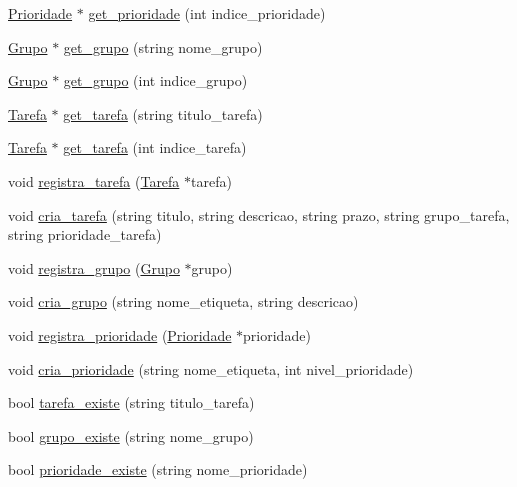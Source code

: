 \begin{DoxyCompactItemize}
\item 
\hyperlink{classPrioridade}{Prioridade} $\ast$ \hyperlink{classStorage_abc3618c3a0b69ffe6e895cd701b0516e}{get\+\_\+prioridade} (int indice\+\_\+prioridade)
\item 
\hyperlink{classGrupo}{Grupo} $\ast$ \hyperlink{classStorage_a1b478e593dd0b18eeb7fc0490b87b362}{get\+\_\+grupo} (string nome\+\_\+grupo)
\item 
\hyperlink{classGrupo}{Grupo} $\ast$ \hyperlink{classStorage_af340fa785af6416b6d7ca0eb38ea4be7}{get\+\_\+grupo} (int indice\+\_\+grupo)
\item 
\hyperlink{classTarefa}{Tarefa} $\ast$ \hyperlink{classStorage_af8f0367791223137d6249220bceb4d22}{get\+\_\+tarefa} (string titulo\+\_\+tarefa)
\item 
\hyperlink{classTarefa}{Tarefa} $\ast$ \hyperlink{classStorage_ae1d09a603b179fe84c9d4e1dfa02e4cb}{get\+\_\+tarefa} (int indice\+\_\+tarefa)
\item 
void \hyperlink{classStorage_a128d891f8907c1089e8ac925743b0446}{registra\+\_\+tarefa} (\hyperlink{classTarefa}{Tarefa} $\ast$tarefa)
\item 
void \hyperlink{classStorage_a53b5c543a7eb6ca4bb7a83433b67e977}{cria\+\_\+tarefa} (string titulo, string descricao, string prazo, string grupo\+\_\+tarefa, string prioridade\+\_\+tarefa)
\item 
void \hyperlink{classStorage_a566777194a365ed00d442ec3d531e146}{registra\+\_\+grupo} (\hyperlink{classGrupo}{Grupo} $\ast$grupo)
\item 
void \hyperlink{classStorage_ae08fbaf921bcbbd0b92da839ff930e76}{cria\+\_\+grupo} (string nome\+\_\+etiqueta, string descricao)
\item 
void \hyperlink{classStorage_a203e5aad2fc6a8fbd4a23b37c4cb9f3c}{registra\+\_\+prioridade} (\hyperlink{classPrioridade}{Prioridade} $\ast$prioridade)
\item 
void \hyperlink{classStorage_a2cb353c0910afe7c69996b51dc65a754}{cria\+\_\+prioridade} (string nome\+\_\+etiqueta, int nivel\+\_\+prioridade)
\item 
bool \hyperlink{classStorage_a501b15eb866bfbc27aa968ce96b8ae8b}{tarefa\+\_\+existe} (string titulo\+\_\+tarefa)
\item 
bool \hyperlink{classStorage_a7d38af18bdb46b1c8928cdadca13db52}{grupo\+\_\+existe} (string nome\+\_\+grupo)
\item 
bool \hyperlink{classStorage_aaa42cd171fb2624c9675e2b220d532e4}{prioridade\+\_\+existe} (string nome\+\_\+prioridade)
\item 

\end{DoxyCompactItemize}

